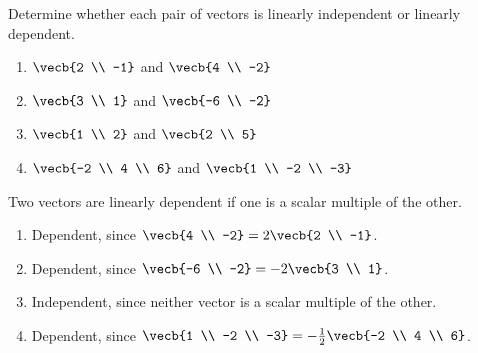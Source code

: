 \begin{Exercise}[title = Testing Linear Independence, label = indep1]
Determine whether each pair of vectors is linearly independent or linearly dependent.
\begin{enumerate}
\item $\vecb{2 \\ -1}$ and $\vecb{4 \\ -2}$
\item $\vecb{3 \\ 1}$ and $\vecb{-6 \\ -2}$
\item $\vecb{1 \\ 2}$ and $\vecb{2 \\ 5}$
\item $\vecb{-2 \\ 4 \\ 6}$ and $\vecb{1 \\ -2 \\ -3}$
\end{enumerate}
\end{Exercise}

\begin{Answer}[ref = indep1]
Two vectors are linearly dependent if one is a scalar multiple of the other.
\begin{enumerate}
\item Dependent, since $\vecb{4 \\ -2} = 2\vecb{2 \\ -1}$.
\item Dependent, since $\vecb{-6 \\ -2} = -2\vecb{3 \\ 1}$.
\item Independent, since neither vector is a scalar multiple of the other.
\item Dependent, since $\vecb{1 \\ -2 \\ -3} = -\frac{1}{2}\vecb{-2 \\ 4 \\ 6}$.
\end{enumerate}
\end{Answer}



